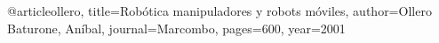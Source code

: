 @article{ollero,
  title={Robótica manipuladores y robots móviles},
  author={Ollero Baturone, Aníbal},
  journal={Marcombo},
  pages={600},
  year={2001}
}
  